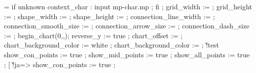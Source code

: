 {   \edef\@@FLOLlijndikte{\the\scratchdimen}%
   \ifdim\@@FLOLstraal<2.5\scratchdimen
     \scratchdimen=2.5\scratchdimen
     \edef\@@FLOLstraal{\the\scratchdimen}%
     \ifdim\@@FLOLstraal>\@@FLOWdx
       \scratchdimen=\@@FLOWdx
       \edef\@@FLOLstraal{\the\scratchdimen}%
     \fi
     \ifdim\@@FLOLstraal>\@@FLOWdy
       \scratchdimen=\@@FLOWdy
       \edef\@@FLOLstraal{\the\scratchdimen}%
     \fi
   \else
     \scratchdimen=\@@FLOLstraal
     \edef\@@FLOLstraal{\the\scratchdimen}%
   \fi
   \processaction %
     [\@@FLOWoffset]
     [      \v!geen=>\scratchdimen=-2.5\scratchdimen,
         \v!overlay=>\scratchdimen=-2.5\scratchdimen,
       \v!standaard=>\scratchdimen=\scratchdimen,
         \s!unknown=>\scratchdimen=\@@FLOWoffset,
         \s!default=>\scratchdimen=-2.5\scratchdimen]%
   \edef\@@FLOW@@offset{\the\scratchdimen}%
   \forgetall
   \offinterlineskip
   \resetMPdrawing
   \doglobal\newcounter\FLOWcomment
   \startMPdrawing
     if unknown context_char : input mp-char.mp ; fi ; 
     grid_width             := \FLOWgridwidth ;
     grid_height            := \FLOWgridheight ;
     shape_width            := \FLOWshapewidth ;
     shape_height           := \FLOWshapeheight ;
     connection_line_width  := \@@FLOLlijndikte ;
     connection_smooth_size := \@@FLOLstraal ;
     connection_arrow_size  := \@@FLOLstraal ;
     connection_dash_size   := \@@FLOLstraal ;
     begin_chart(0,\FLOWwidth,\FLOWheight);
     reverse_y := true ;
     chart_offset := \@@FLOW@@offset ;
   \stopMPdrawing
   \doifelsenothing\@@FLOWachtergrondkleur
     {\startMPdrawing
      chart_background_color := white ;
      \stopMPdrawing}
     {\startMPdrawing
      chart_background_color := \MPcolor{\@@FLOWachtergrondkleur} ;
      \stopMPdrawing}%
   \doif\@@FLOWoptie\v!test
     {\startMPdrawing
        show_con_points := true ;
        show_mid_points := true ;
        show_all_points := true ;
      \stopMPdrawing}%
   \processaction %
     [\@@FLOWpunt]
     [     \v!ja=>\startMPdrawing
                    show_con_points := true ;
}
